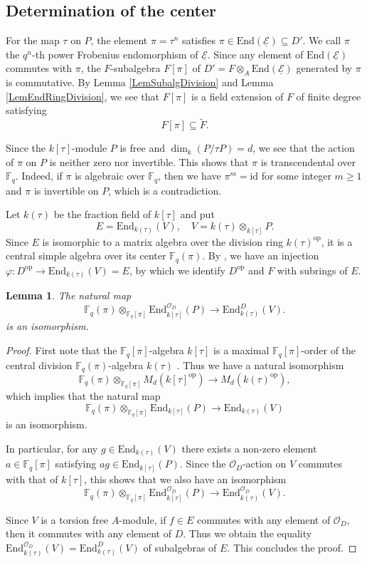 \documentclass[10pt]{amsart}
\theoremstyle{plain}
\newtheorem{lem}[thm]{Lemma}
\theoremstyle{definition}
\newcommand{\End}{\mathrm{End}}
\newcommand{\id}{\mathrm{id}}
\newcommand{\opp}{\mathrm{op}}
\newcommand{\cO}{\mathcal{O}}
\newcommand{\ucE}{\underline{\mathcal{E}}}
\newcommand{\bF}{\mathbb{F}}
\begin{document}
\subsection{Determination of the center}\label{SubsecCenter}

For the map $\tau$ on $P$, the element $\pi=\tau^n$ satisfies $\pi\in \End(\ucE)\subseteq D'$.
We call $\pi$ the $q^n$-th power Frobenius endomorphism of $\ucE$.
Since any element of $\End(\ucE)$ commutes with $\pi$, the $F$-subalgebra $F[\pi]$ of $D'=F\otimes_A \End(\ucE)$ generated by $\pi$ is commutative.
By Lemma \ref{LemSubalgDivision} and Lemma \ref{LemEndRingDivision}, we see that $F[\pi]$ is a field extension of $F$ of finite degree
satisfying
\begin{equation}\label{EqnContainFPi}
	F[\pi]\subseteq \tilde{F}.
\end{equation}

Since the $k[\tau]$-module $P$ is free and $\dim_k(P/\tau P)=d$, we see that the action of $\pi$ on $P$ is neither zero nor invertible. 
This shows that $\pi$ is transcendental over $\bF_q$. Indeed, if $\pi$ is algebraic over $\bF_q$, 
then we have $\pi^m=\id$ for some integer $m\geq 1$ and $\pi$ is invertible on $P$, which is a contradiction.




Let $k(\tau)$ be the fraction field of $k[\tau]$ \cite[Lemma 3.2]{LRS}
and put
\[
E=\End_{k(\tau)}(V),\quad V=k(\tau)\otimes_{k[\tau]}P.
\]
Since $E$ is isomorphic to a matrix algebra over the division ring $k(\tau)^\opp$, it is a central simple algebra over its
center $\bF_q(\pi)$.
By \cite[Corollary 3.8]{LRS}, we have an injection $\varphi:D^\opp\to \End_{k(\tau)}(V)=E$, by which we identify $D^\opp$ and $F$ with subrings of 
$E$. 

\begin{lem}\label{LemPVIsom}
	The natural map
	\[
	\bF_q(\pi)\otimes_{\bF_q[\pi]} \End_{k[\tau]}^{\cO_D}(P)\to \End_{k(\tau)}^{D}(V).
	\]
	is an isomorphism.
\end{lem}
\begin{proof}
	First note that the $\bF_q[\pi]$-algebra $k[\tau]$ is a maximal $\bF_q[\pi]$-order of the central division 
	$\bF_q(\pi)$-algebra $k(\tau)$ \cite[Lemma 4.12.6]{Goss_BOOK}. Thus we have a natural isomorphism
	\[
	\bF_q(\pi)\otimes_{\bF_q[\pi]} M_d(k[\tau]^\opp)\to M_d(k(\tau)^\opp),
	\]
	which implies that the natural map
	\[
	\bF_q(\pi)\otimes_{\bF_q[\pi]} \End_{k[\tau]}(P)\to \End_{k(\tau)}(V)
	\]
	is an isomorphism. 
	
	In particular, for any $g\in \End_{k(\tau)}(V)$ there exists a non-zero element $a\in \bF_q[\pi]$ 
	satisfying $a g\in \End_{k[\tau]}(P)$. Since the $\cO_D$-action on $V$ commutes with that of $k[\tau]$, this shows that
	we also have an isomorphism
	\[
	\bF_q(\pi)\otimes_{\bF_q[\pi]} \End_{k[\tau]}^{\cO_D}(P)\to \End_{k(\tau)}^{\cO_D}(V).
	\]
	
	Since $V$ is a torsion free $A$-module, if $f\in E$ commutes with any element of $\cO_D$, then it commutes with
	any element of $D$. Thus we obtain the equality $\End_{k(\tau)}^{\cO_D}(V)=\End_{k(\tau)}^{D}(V)$ of subalgebras of $E$.
	This concludes the proof.
\end{proof}
\end{document}
